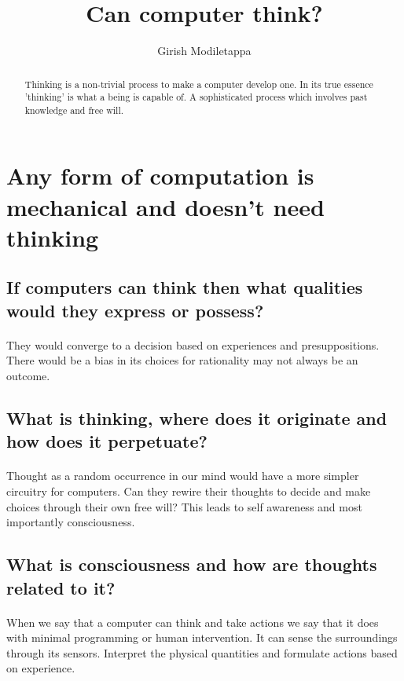 \documentclass[]{article}
\title{Can computer think?}
\author{Girish Modiletappa}
\begin{document}
\maketitle

\begin{abstract}
Thinking is a non-trivial process to make a computer develop one. In its true essence 'thinking' is what a being is capable of. A sophisticated process which involves past knowledge
and free will.
\end{abstract}

\section{Any form of computation is mechanical and doesn't need thinking}
\subsection{If computers can think then what qualities would they express or possess?}
\paragraph{}They would converge to a decision based on experiences and presuppositions. There would be a bias
in its choices for rationality may not always be an outcome.
\subsection{What is thinking, where does it originate and how does it perpetuate?}
\paragraph{}
Thought as a random occurrence in our mind would have a more simpler circuitry for computers. Can they
rewire their thoughts to decide and make choices through their own free will? This leads to self awareness
and most importantly consciousness.
\subsection{What is consciousness and how are thoughts related to it?} 
\paragraph{}
When we say that a computer can think and take actions we say that it does with minimal programming or human
intervention. It can sense the surroundings through its sensors. Interpret the physical quantities and formulate
actions based on experience.
\end{document}
